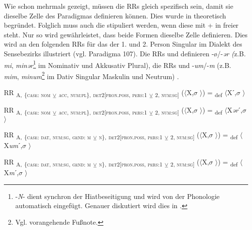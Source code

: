 Wie schon mehrmals gezeigt, müssen die RRs gleich spezifisch sein, damit sie dieselbe Zelle des Paradigmas definieren können. Dies wurde in  theoretisch begründet. Folglich muss auch die  stipuliert werden, wenn diese mit  +  in freier  steht. Nur so wird gewährleistet, dass beide Formen dieselbe Zelle definieren. Dies wird an den folgenden RRs für das  der 1. und 2. Person Singular im Dialekt des Sensebezirks illustriert (vgl. Paradigma 107). Die RRs  und  definieren -ø/-\textit{ər (}z.B. \textit{mi}, \textit{minər}\footnote{-\textit{N}- dient synchron der Hiatbeseitigung und wird von der Phonologie automatisch eingefügt. Genauer diskutiert wird dies in .} im Nominativ und Akkusativ Plural), die RRs  und  -\textit{um}/-\textit{m} (z.B. \textit{mim}, \textit{minum}\footnote{Vgl. vorangehende Fußnote.} im Dativ Singular Maskulin und Neutrum) \citep[198]{Henzen1927}.

\ea%
\label{ex:key:144}
 RR \textsubscript{A,} \textsubscript{\{\textsc{case:} \textsc{nom}} \textsubscript{\tiny $\veebar$}\textsubscript{ \textsc{acc}}\textsubscript{, \textsc{num:pl}\}}\textsubscript{,} \textsubscript{\textsc{det2[pron.poss}, \textsc{pers:1}} \textsubscript{\tiny $\veebar$} \textsubscript{\textsc{2}}\textsubscript{, \textsc{num:sg}]} ($\langle$X,$\sigma$ $\rangle$) = \textsubscript{def} $\langle$Xˊ,$\sigma$ $\rangle$
\z

\ea%
\label{ex:key:145}
 RR \textsubscript{A,} \textsubscript{\{\textsc{case:} \textsc{nom}} \textsubscript{\tiny $\veebar$}\textsubscript{ \textsc{acc}}\textsubscript{, \textsc{num:pl}\}}\textsubscript{,} \textsubscript{\textsc{det2[pron.poss}, \textsc{pers:1}} \textsubscript{\tiny $\veebar$} \textsubscript{\textsc{2}}\textsubscript{, \textsc{num:sg}]} ($\langle$X,$\sigma$ $\rangle$) = \textsubscript{def} $\langle$X\textit{ər}ˊ,$\sigma$ $\rangle$
\z

\ea%
\label{ex:key:146}
 RR \textsubscript{A,} \textsubscript{\{\textsc{case: dat}, \textsc{num:sg}, \textsc{gend: m}} \textsubscript{\tiny $\veebar$} \textsubscript{\textsc{n}\}}\textsubscript{,} \textsubscript{\textsc{det2[pron.poss}, \textsc{pers:1}} \textsubscript{\tiny $\veebar$} \textsubscript{\textsc{2}}\textsubscript{, \textsc{num:sg}]} ($\langle$X,$\sigma$ $\rangle$) = \textsubscript{def}   $\langle$X\textit{um}ˊ,$\sigma$ $\rangle$
\z

\ea%
\label{ex:key:147}
 RR \textsubscript{A,} \textsubscript{\{\textsc{case: dat}, \textsc{num:sg}, \textsc{gend: m}} \textsubscript{\tiny $\veebar$} \textsubscript{\textsc{n}\}}\textsubscript{,} \textsubscript{\textsc{det2[pron.poss}, \textsc{pers:1}} \textsubscript{\tiny $\veebar$} \textsubscript{\textsc{2}}\textsubscript{, \textsc{num:sg}]} ($\langle$X,$\sigma$ $\rangle$) = \textsubscript{def}   $\langle$X\textit{m}ˊ,$\sigma$ $\rangle$
\z

